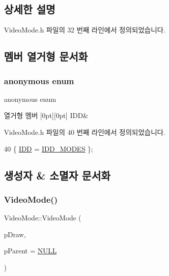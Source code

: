 \subsection{상세한 설명}


Video\+Mode.\+h 파일의 32 번째 라인에서 정의되었습니다.



\subsection{멤버 열거형 문서화}
\mbox{\label{class_video_mode_a5888f5e68b768e91695a058cace7e5a4}} 
\subsubsection{\texorpdfstring{anonymous enum}{anonymous enum}}
{\footnotesize\ttfamily anonymous enum}

\begin{DoxyEnumFields}{열거형 멤버}
[0pt][0pt]{}\mbox{\label{class_video_mode_a5888f5e68b768e91695a058cace7e5a4a7012b5b58902e093e7c2a0547ef63dd5}} 
I\+DD&\\
\hline

\end{DoxyEnumFields}


Video\+Mode.\+h 파일의 40 번째 라인에서 정의되었습니다.


\begin{DoxyCode}
40 \{ \mbox{\hyperlink{class_video_mode_a5888f5e68b768e91695a058cace7e5a4a7012b5b58902e093e7c2a0547ef63dd5}{IDD}} = \mbox{\hyperlink{resource_8h_ac61a9df5a096bacfac51de9efeac0a15}{IDD\_MODES}} \};
\end{DoxyCode}


\subsection{생성자 \& 소멸자 문서화}
\mbox{\label{class_video_mode_a1546b8240c6190c4c3f951ffcb74411c}} 
\subsubsection{\texorpdfstring{Video\+Mode()}{VideoMode()}}
{\footnotesize\ttfamily Video\+Mode\+::\+Video\+Mode (\begin{DoxyParamCaption}\item[{L\+P\+D\+I\+R\+E\+C\+T\+D\+R\+A\+W7}]{p\+Draw,  }\item[{C\+Wnd $\ast$}]{p\+Parent = {\ttfamily \mbox{\hyperlink{_system_8h_a070d2ce7b6bb7e5c05602aa8c308d0c4}{N\+U\+LL}}} }\end{DoxyParamCaption})}



